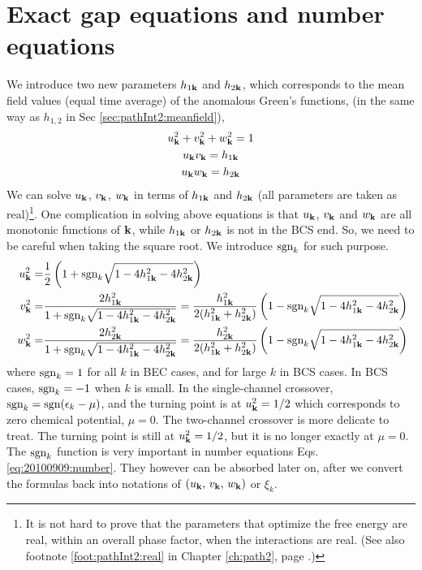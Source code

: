  \section{Exact gap equations and number equations}
We introduce two new parameters $h_{1\mathbf{k}}$ and $h_{2\mathbf{k}}$, which corresponds to the mean field values (equal time average) of the anomalous Green's functions,  (in the same way as  $h_{1,2}$  in Sec \ref{sec:pathInt2:meanfield}), 
\begin{gather}
u_{\mathbf{k}}^2+v^{2}_{\mathbf{k}}+w^{2}_{\mathbf{k}}=1\\
u_{\mathbf{k}}v_{\mathbf{k}}=h_{1\mathbf{k}}\\
u_{\mathbf{k}}w_{\mathbf{k}}=h_{2\mathbf{k}}
\end{gather}
We can solve $u_{\mathbf{k}}$, $v_{\mathbf{k}}$, $w_{\mathbf{k}}$ in terms of  $h_{1\mathbf{k}}$ and $h_{2\mathbf{k}}$ (all parameters are taken as real)\footnote{It is not hard to prove that the parameters that optimize the free energy are real, within an overall phase factor, when the interactions are real. (See also footnote \ref{foot:pathInt2:real} in Chapter \ref{ch:path2}, page \pageref{foot:pathInt2:real}.)}.  One complication in solving above equations is that $u_{\mathbf{k}}$, $v_{\mathbf{k}}$ and  $w_{\mathbf{k}}$ are all  monotonic functions of $\mathbf{k}$, while $h_{1\mathbf{k}}$ or $h_{2\mathbf{k}}$ is not in the BCS end.  So, we need to be careful when taking the square root.  We introduce $\text{sgn}_k$ for such purpose.  
\begin{equation}\label{eq:uvw:uvwh12}
\begin{split}
u_{\mathbf{k}}^2=&\frac{1}{2} \left(1+\text{sgn}_{k}\sqrt{1-4 h_{1\mathbf{k}}^2-4 h_{2\mathbf{k}}^2}\right)\\
v^{2}_{\mathbf{k}}=&\frac{2 h_{1\mathbf{k}}^2}{1+\text{sgn}_{k}\sqrt{1-4 h_{1\mathbf{k}}^2-4 h_{2\mathbf{k}}^2}}
=\frac{ h_{1\mathbf{k}}^2}{2( h_{1\mathbf{k}}^2+ h_{2\mathbf{k}}^2)} \left(1-\text{sgn}_{k}\sqrt{1-4 h_{1\mathbf{k}}^2-4 h_{2\mathbf{k}}^2}\right)\\\
w^{2}_{\mathbf{k}}=&\frac{2 h_{2\mathbf{k}}^2}{1+\text{sgn}_{k}\sqrt{1-4 h_{1\mathbf{k}}^2-4 h_{2\mathbf{k}}^2}}
=\frac{h_{2\mathbf{k}}^2}{2( h_{1\mathbf{k}}^2+ h_{2\mathbf{k}}^2)} \left(1-\text{sgn}_{k}\sqrt{1-4 h_{1\mathbf{k}}^2-4 h_{2\mathbf{k}}^2}\right)
\end{split}
\end{equation}
  where $\text{sgn}_k=1$  for all $k$ in BEC cases, and  for large $k$ in BCS cases. In BCS cases,  $\text{sgn}_{k}=-1$ when $k$ is small.  In the single-channel crossover, $\text{sgn}_{k}=\text{sgn}(\epsilon_{k}-\mu)$, and the turning point is at $u_{\mathbf{k}}^2=1/2$ which corresponds to zero chemical potential, $\mu=0$.  The two-channel crossover is more delicate to treat.  The turning point is still at $u_{\mathbf{k}}^2=1/2$, but it is no longer exactly at $\mu=0$.  The $\text{sgn}_{k}$ function  is very important in number equations Eqs. \ref{eq:20100909:number}.  They however can be  absorbed later on, after we convert the formulas back into notations of  $(u_{\mathbf{k}},\,v_{\mathbf{k}}, \,w_{\mathbf{k}})$ or $\xi_{k}$.


